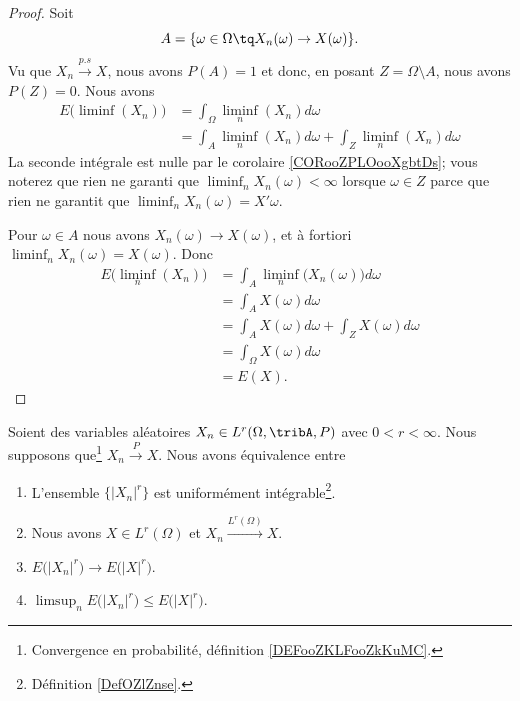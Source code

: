 \begin{proof}
	Soit
	\begin{equation}
		A=\{ \omega\in\Omega\tq X_n(\omega)\to X(\omega) \}.
	\end{equation}
	Vu que \( X_n\stackrel{ p.s}{\longrightarrow} X\), nous avons \( P(A)=1\) et donc, en posant \( Z=\Omega\setminus A\), nous avons \( P(Z)=0\). Nous avons
	\begin{subequations}
		\begin{align}
			E\big( \liminf(X_n) \big) & =\int_{\Omega}\liminf_n(X_n)d\omega                          \\
			                          & =\int_{A}\liminf_n(X_n)d\omega+\int_{Z}\liminf_n(X_n)d\omega
		\end{align}
	\end{subequations}
	La seconde intégrale est nulle par le corolaire \ref{CORooZPLOooXgbtDs}; vous noterez que rien ne garanti que \( \liminf_n X_n(\omega)<\infty\) lorsque \( \omega\in Z\) parce que rien ne garantit que \( \liminf_nX_n(\omega)=X'\omega\).

	Pour \( \omega\in A\) nous avons \( X_n(\omega)\to X(\omega)\), et à fortiori \( \liminf_n X_n(\omega)=X(\omega)\). Donc
	\begin{subequations}
		\begin{align}
			E\big( \liminf_n(X_n) \big) & =\int_A\liminf_n\big( X_n(\omega) \big)d\omega  \\
			                            & =\int_AX(\omega)d\omega                         \\
			                            & =\int_AX(\omega)d\omega +\int_ZX(\omega)d\omega \\
			                            & =\int_{\Omega}X(\omega)d\omega                  \\
			                            & =E(X).
		\end{align}
	\end{subequations}
\end{proof}


\begin{theorem}	\label{THOooEPYBooHlSuLI}
	Soient des variables aléatoires \( X_n\in L^r(\Omega,\tribA,P)\) avec \( 0<r<\infty\). Nous supposons que\footnote{Convergence en probabilité, définition \ref{DEFooZKLFooZkKuMC}.} \( X_n\stackrel{ P}{\longrightarrow} X\). Nous avons équivalence entre
	\begin{enumerate}
		\item		\label{SPITEMooGKRVooQoDfKm}
		      L'ensemble \( \{ | X_n |^r \}\) est uniformément intégrable\footnote{Définition \ref{DefOZlZnse}.}.
		\item		\label{SPITEMooUYTKooBClYcR}
		      Nous avons \( X\in L^r(\Omega) \) et \( X_n\stackrel{ L^r(\Omega)}{\longrightarrow} X\).
		\item		\label{SPITEMooQYLOooDiBvne}
		      \( E\big( | X_n |^r \big)\to E\big( | X |^r \big)\).
		\item		\label{SPITEMooRVFAooXUNQlf}
		      \( \limsup_n E\big( | X_n |^r \big)\leq E\big( | X |^r \big)\).
	\end{enumerate}
\end{theorem}

